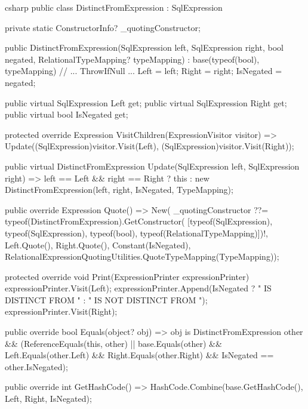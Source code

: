 \begin{sourcecode}{csharp}
public class DistinctFromExpression : SqlExpression
{
    private static ConstructorInfo? _quotingConstructor;

    public DistinctFromExpression(SqlExpression left, SqlExpression right, bool negated,
        RelationalTypeMapping? typeMapping)
        : base(typeof(bool), typeMapping)
    {
        // ... ThrowIfNull ...
        Left = left;
        Right = right;
        IsNegated = negated;
    }

    public virtual SqlExpression Left { get; }
    public virtual SqlExpression Right { get; }
    public virtual bool IsNegated { get; }

    protected override Expression VisitChildren(ExpressionVisitor visitor)
        => Update((SqlExpression)visitor.Visit(Left), (SqlExpression)visitor.Visit(Right));

    public virtual DistinctFromExpression Update(SqlExpression left, SqlExpression right)
        => left == Left && right == Right
            ? this
            : new DistinctFromExpression(left, right, IsNegated, TypeMapping);

    public override Expression Quote()
        => New(
            _quotingConstructor ??= typeof(DistinctFromExpression).GetConstructor(
                [typeof(SqlExpression), typeof(SqlExpression), typeof(bool),
                 typeof(RelationalTypeMapping)])!,
            Left.Quote(), Right.Quote(), Constant(IsNegated),
            RelationalExpressionQuotingUtilities.QuoteTypeMapping(TypeMapping));

    protected override void Print(ExpressionPrinter expressionPrinter)
    {
        expressionPrinter.Visit(Left);
        expressionPrinter.Append(IsNegated ? " IS DISTINCT FROM " : " IS NOT DISTINCT FROM ");
        expressionPrinter.Visit(Right);
    }

    public override bool Equals(object? obj)
        => obj is DistinctFromExpression other
           && (ReferenceEquals(this, other)
               || base.Equals(other) && Left.Equals(other.Left)
                  && Right.Equals(other.Right) && IsNegated == other.IsNegated);

    public override int GetHashCode()
        => HashCode.Combine(base.GetHashCode(), Left, Right, IsNegated);
}
\end{sourcecode}

